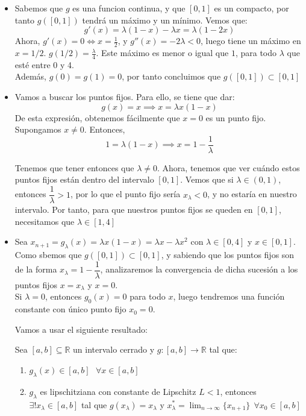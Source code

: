 \documentclass[11pt]{article}
\begin{document}
\begin{itemize}
	\item Sabemos que $g$ es una funcion continua, y que $[0,1]$ es un compacto, por tanto $g([0,1])$ tendrá un máximo y un mínimo. Vemos que:
	\[
	g'(x) = \lambda(1-x) - \lambda x  = \lambda(1-2x)
	\]
	Ahora, $g'(x) = 0 \iff x = \frac{1}{2}$, y $g''(x) = -2 \lambda < 0$, luego tiene un máximo en $x=1/2$. $g(1/2) = \frac{\lambda}{4}$. Este máximo es menor o igual que $1$, para todo $\lambda$ que esté entre 0 y 4.\\
	Además, $g(0) = g(1) = 0$, por tanto concluimos que $g([0,1]) \subset [0,1]$
	
	\item Vamos a buscar los puntos fijos. Para ello, se tiene que dar:
	\[
	g(x) = x \implies x = \lambda x(1-x)
	\]
	De esta expresión, obtenemos fácilmente que $x=0$ es un punto fijo. Supongamos $x\ne0$. Entonces,
	\[
	1 = \lambda(1-x) \implies x = 1- \dfrac{1}{\lambda}
	\]
	
	Tenemos que tener entonces que $\lambda \ne 0$. Ahora, tenemos que ver cuándo estos puntos fijos están dentro del intervalo $[0,1]$. Vemos que si $\lambda \in (0,1)$, entonces $\dfrac{1}{\lambda}>1$, por lo que el punto fijo sería $x_\lambda < 0$, y no estaría en nuestro intervalo. Por tanto, para que nuestros puntos fijos se queden en $[0,1]$, necesitamos que $\lambda \in [1,4]$
	
	\item Sea $x_{n+1} = g_\lambda(x) = \lambda x(1-x) = \lambda x - \lambda x^2$ con $\lambda \in [0,4]$ y $x \in [0,1]$. Como sbemos que $g([0,1]) \subset [0,1]$, y sabiendo que los puntos fijos son de la forma $x_\lambda = 1 - \dfrac{1}{\lambda}$, analizaremos la convergencia de dicha sucesión a los puntos fijos $x=x_\lambda$ y $x=0$.\\
	Si $\lambda = 0$, entonces $g_0 (x) = 0$ para todo $x$, luego tendremos una función constante con único punto fijo $x_0 = 0$.
	
	Vamos a usar el siguiente resultado:
	
	Sea $[a,b] \subseteq \mathbb R$ un intervalo cerrado y $g:[a,b] \to \mathbb R$ tal que:
	\begin{enumerate}
	\item $g_\lambda(x) \in [a,b] \ \ \ \forall x \in [a,b]$
	\item $g_\lambda$ es lipschitziana con constante de Lipschitz $L<1$, entonces $\exists ! x_\lambda \in [a,b]$ tal que $g(x_\lambda) = x_\lambda$ y $x_\lambda ^* = \lim_{n \to \infty} \{x_{n+1}\} \ \ \forall x_0 \in [a,b]$
\end{enumerate}


\end{itemize}
\end{document}
